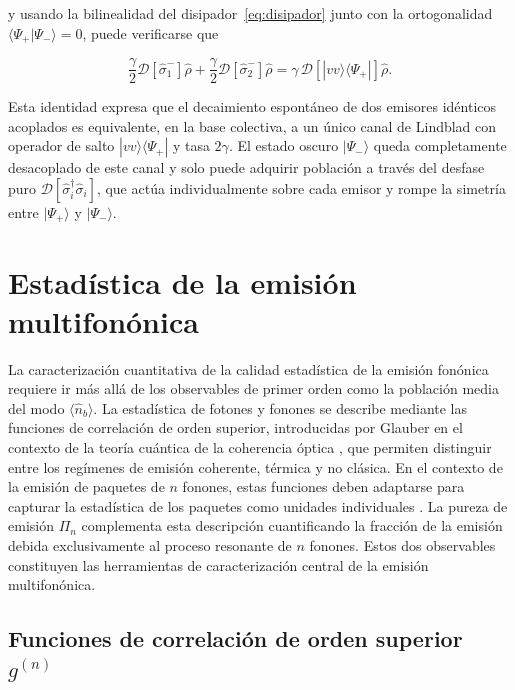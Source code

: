 y usando la bilinealidad del disipador~\eqref{eq:disipador} junto con la ortogonalidad $\langle\Psi_+|\Psi_-\rangle = 0$, puede verificarse que

\begin{equation}
	\frac{\gamma}{2}\mathcal{D}[\hat{\sigma}_1^-]\hat{\rho}
	+ \frac{\gamma}{2}\mathcal{D}[\hat{\sigma}_2^-]\hat{\rho}
	= \gamma\,\mathcal{D}\!\left[|vv\rangle\langle\Psi_+|\right]\hat{\rho}.
	\label{eq:lindblad_colectivo}
\end{equation}

Esta identidad expresa que el decaimiento espontáneo de dos emisores idénticos acoplados es equivalente, en la base colectiva, a un único canal de Lindblad con operador de salto $|vv\rangle\langle\Psi_+|$ y tasa $2\gamma$. El estado oscuro $|\Psi_-\rangle$ queda completamente desacoplado de este canal y solo puede adquirir población a través del desfase puro
$\mathcal{D}[\hat{\sigma}_i^\dagger\hat{\sigma}_i]$, que actúa individualmente sobre cada emisor y rompe la simetría entre $|\Psi_+\rangle$ y $|\Psi_-\rangle$.


\section{Estadística de la emisión multifonónica}
\label{sec:estadistica}

La caracterización cuantitativa de la calidad estadística de la emisión fonónica requiere ir más allá de los observables de primer orden como la población media del modo $\langle\hat{n}_b\rangle$. La estadística de fotones y fonones se describe mediante las funciones de correlación de orden superior, introducidas por Glauber en el contexto de la teoría cuántica de la coherencia óptica \cite{glauber1963}, que permiten distinguir entre los regímenes de emisión coherente, térmica y no clásica. En el contexto de la emisión de paquetes de $n$ fonones, estas funciones deben adaptarse para capturar la estadística de los paquetes como unidades individuales \cite{bin2020}. La pureza de emisión $\Pi_n$ \cite{munoz2014,munoz2018} complementa esta descripción cuantificando la fracción de la emisión debida exclusivamente al proceso resonante de $n$ fonones. Estos dos observables constituyen las herramientas de caracterización central de la emisión multifonónica.

\subsection{Funciones de correlación de orden superior $g^{(n)}$}
\label{sec:correlaciones}

